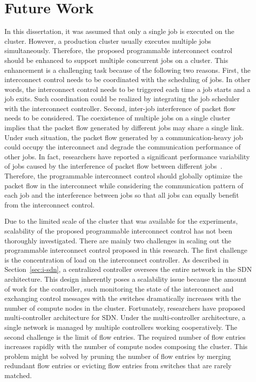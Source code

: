 \section{Future Work}

In this dissertation, it was assumed that only a single job is executed on the
cluster. However, a production cluster usually executes multiple jobs
simultaneously. Therefore, the proposed programmable interconnect control
should be enhanced to support multiple concurrent jobs on a cluster. This
enhancement is a challenging task because of the following two reasons. First,
the interconnect control needs to be coordinated with the scheduling of jobs.
In other words, the interconnect control needs to be triggered each time a job
starts and a job exits. Such coordination could be realized by integrating the
job scheduler with the interconnect controller. Second, inter-job interference
of packet flow needs to be considered. The coexistence of multiple jobs on a
single cluster implies that the packet flow generated by different jobs may
share a single link. Under such situation, the packet flow generated by a
communication-heavy job could occupy the interconnect and degrade the
communication performance of other jobs. In fact, researchers have reported a
significant performance variability of jobs caused by the interference of
packet flow between different jobs~\cite{Bhatele2013}. Therefore, the
programmable interconnect control should globally optimize the packet flow in
the interconnect while considering the communication pattern of each job and
the interference between jobs so that all jobs can equally benefit from the
interconnect control.

Due to the limited scale of the cluster that was available for the
experiments, scalability of the proposed programmable interconnect control has
not been thoroughly investigated. There are mainly two challenges in scaling
out the programmable interconnect control proposed in this research. The first
challenge is the concentration of load on the interconnect controller. As
described in Section~\ref{sec:i-sdn}, a centralized controller oversees the
entire network in the SDN architecture. This design inherently poses a
scalability issue because the amount of work for the controller, such
monitoring the state of the interconnect and exchanging control messages with
the switches dramatically increases with the number of compute nodes in the
cluster. Fortunately, researchers have proposed multi-controller
architecture for SDN\cite{Hu2018}. Under the multi-controller architecture,
a single network is managed by multiple controllers working cooperatively.
The second challenge is the limit of flow entries. The required number of flow
entries increases rapidly with the number of compute nodes composing the
cluster. This problem might be solved by pruning the number of flow entries by
merging redundant flow entries or evicting flow entries from switches that are
rarely matched.
